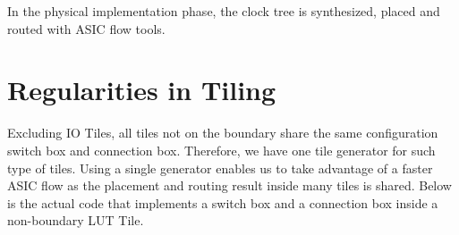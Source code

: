In the physical implementation phase, the clock tree is synthesized, placed
 and routed with ASIC flow tools. \par

\section{Regularities in Tiling}
\label{sec:regular_tile}
Excluding IO Tiles, all tiles not on the boundary share the same configuration switch box and connection box. Therefore, we have
one tile generator for such type of tiles. Using a single generator enables us to take advantage of a faster ASIC flow as the 
placement and routing result inside many tiles is shared. Below is the actual code that implements a switch box and a
 connection box inside a non-boundary LUT Tile.\par

